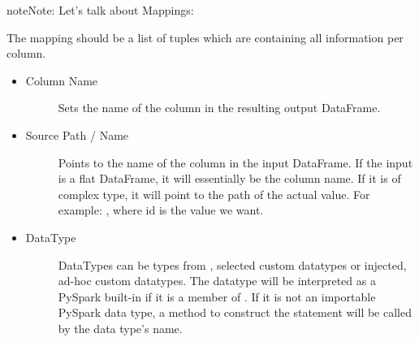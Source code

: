 \documentclass[a4paper,10pt, twoside,english]{sphinxmanual}
\begin{document}
\begin{fulllineitems}
\begin{quote}
\begin{description}
\end{description}\end{quote}

\begin{sphinxadmonition}{note}{Note:}
Let’s talk about Mappings:

The mapping should be a list of tuples which are containing all information per column.
\begin{itemize}
\item {} \begin{description}
\item[{Column Name}] \leavevmode{[}\sphinxhref{https://docs.python.org/3.7/library/stdtypes.html\#str}{\sphinxcode{\sphinxupquote{str}}}{]}
Sets the name of the column in the resulting output DataFrame.

\end{description}

\item {} \begin{description}
\item[{Source Path / Name}] \leavevmode{[}\sphinxhref{https://docs.python.org/3.7/library/stdtypes.html\#str}{\sphinxcode{\sphinxupquote{str}}}{]}
Points to the name of the column in the input DataFrame. If the input
is a flat DataFrame, it will essentially be the column name. If it is of complex
type, it will point to the path of the actual value. For example:
, where id is the value we want.

\end{description}

\item {} \begin{description}
\item[{DataType}] \leavevmode{[}\sphinxhref{https://docs.python.org/3.7/library/stdtypes.html\#str}{\sphinxcode{\sphinxupquote{str}}}{]}
DataTypes can be types from , selected custom datatypes or
injected, ad-hoc custom datatypes.
The datatype will be interpreted as a PySpark built-in if it is a member of .
If it is not an importable PySpark data type, a method to construct the statement will be
called by the data type’s name.

\end{description}

\end{itemize}
\end{sphinxadmonition}


\end{fulllineitems}
\end{document}
